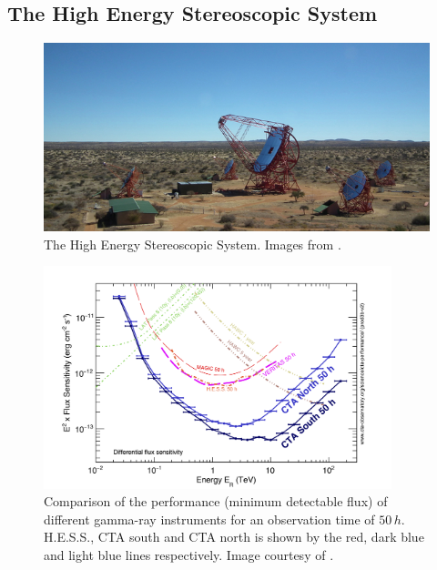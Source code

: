 \subsection{The High Energy Stereoscopic System} \label{sec:02_HESS}

\begin{figure}[h]
    \centering
    \includegraphics[width=\textwidth]{05_Astronomy/Images/telescopes/HESS_image.jpg}
    \caption{The High Energy Stereoscopic System. Images from \citep{HESS}.}
    \label{fig:chapter_2_HESS}
\end{figure}
\begin{figure}[h]
    \centering
    \includegraphics[width=0.9\textwidth]{05_Astronomy/Images/telescopes/sensitivity_comparison.png}
    \caption{Comparison of the performance (minimum detectable flux) of different gamma-ray instruments for an observation time of $50\,\si{h}$. H.E.S.S., CTA south and CTA north is shown by the red, dark blue and light blue lines respectively. Image courtesy of \cite{2019scta.book.....C}.}
    \label{fig:chapter_2_sensitivity comparison}
\end{figure}

